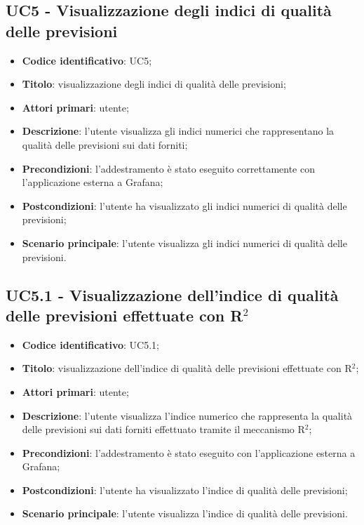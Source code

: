 \subsection{UC5 - Visualizzazione degli indici di qualità delle previsioni}
\begin{itemize}
	\item \textbf{Codice identificativo}: UC5;
	\item \textbf{Titolo}: visualizzazione degli indici di qualità delle previsioni;
	\item \textbf{Attori primari}: utente;
	\item \textbf{Descrizione}: l'utente visualizza gli indici numerici che rappresentano la qualità delle previsioni sui dati forniti;
	\item \textbf{Precondizioni}: l'addestramento è stato eseguito correttamente con l'applicazione esterna a Grafana\glo;
	\item \textbf{Postcondizioni}: l'utente ha visualizzato gli indici numerici di qualità delle previsioni;
	\item \textbf{Scenario principale}: l'utente visualizza gli indici numerici di qualità delle previsioni.
\end{itemize} 
\subsection{UC5.1 - Visualizzazione dell'indice di qualità delle previsioni effettuate con R$^{2}$}
\begin{itemize}
	\item \textbf{Codice identificativo}: UC5.1;
	\item \textbf{Titolo}: visualizzazione dell'indice di qualità delle previsioni effettuate con R$^{2}$\glo;
	\item \textbf{Attori primari}: utente;
	\item \textbf{Descrizione}: l'utente visualizza l'indice numerico che rappresenta la qualità delle previsioni sui dati forniti effettuato tramite il meccanismo R$^{2}$\glo;
	\item \textbf{Precondizioni}: l'addestramento è stato eseguito con l'applicazione esterna a Grafana\glo;
	\item \textbf{Postcondizioni}: l'utente ha visualizzato l'indice di qualità delle previsioni;
	\item \textbf{Scenario principale}: l'utente visualizza l'indice di qualità delle previsioni.
\end{itemize} 
